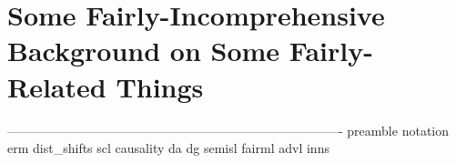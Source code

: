 \chapter{Some Fairly-Incomprehensive Background on Some Fairly-Related Things}\label{ch:background}
-------------------------------------------------------------------------------
{preamble}
{notation}
{erm}
{dist_shifts}
{scl}
{causality}
{da}
{dg}
{semisl}
{fairml}
{advl}
{inns}

